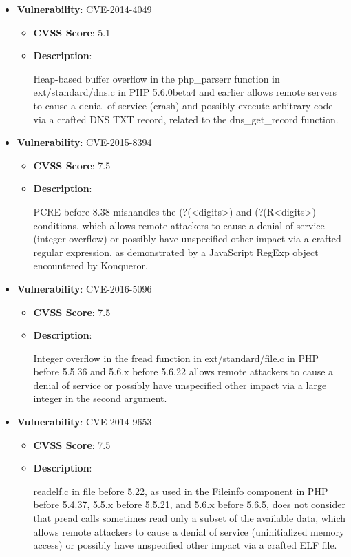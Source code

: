 \documentclass{article}
\begin{document}
\begin{itemize}
        \item \textbf{Vulnerability}: CVE-2014-4049
        \begin{itemize}
            \item \textbf{CVSS Score}:  5.1 
            \item \textbf{Description}:
            \parbox[t]{0.9\linewidth}{
                \ttfamily Heap-based buffer overflow in the php\_parserr function in ext/standard/dns.c in PHP 5.6.0beta4 and earlier allows remote servers to cause a denial of service (crash) and possibly execute arbitrary code via a crafted DNS TXT record, related to the dns\_get\_record function.
            }
        \end{itemize}
    
        \item \textbf{Vulnerability}: CVE-2015-8394
        \begin{itemize}
            \item \textbf{CVSS Score}:  7.5 
            \item \textbf{Description}:
            \parbox[t]{0.9\linewidth}{
                \ttfamily PCRE before 8.38 mishandles the (?(<digits>) and (?(R<digits>) conditions, which allows remote attackers to cause a denial of service (integer overflow) or possibly have unspecified other impact via a crafted regular expression, as demonstrated by a JavaScript RegExp object encountered by Konqueror.
            }
        \end{itemize}
    
        \item \textbf{Vulnerability}: CVE-2016-5096
        \begin{itemize}
            \item \textbf{CVSS Score}:  7.5 
            \item \textbf{Description}:
            \parbox[t]{0.9\linewidth}{
                \ttfamily Integer overflow in the fread function in ext/standard/file.c in PHP before 5.5.36 and 5.6.x before 5.6.22 allows remote attackers to cause a denial of service or possibly have unspecified other impact via a large integer in the second argument.
            }
        \end{itemize}
    
        \item \textbf{Vulnerability}: CVE-2014-9653
        \begin{itemize}
            \item \textbf{CVSS Score}:  7.5 
            \item \textbf{Description}:
            \parbox[t]{0.9\linewidth}{
                \ttfamily readelf.c in file before 5.22, as used in the Fileinfo component in PHP before 5.4.37, 5.5.x before 5.5.21, and 5.6.x before 5.6.5, does not consider that pread calls sometimes read only a subset of the available data, which allows remote attackers to cause a denial of service (uninitialized memory access) or possibly have unspecified other impact via a crafted ELF file.
            }
        \end{itemize}
    

\end{itemize}
\end{document}
